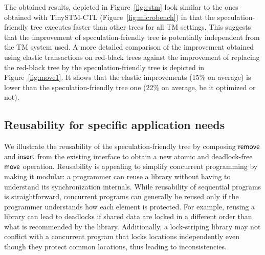 The obtained results, depicted in Figure~\ref{fig:estm} look similar to the ones obtained with TinySTM-CTL
(Figure~\ref{fig:microbench}) in that the speculation-friendly tree executes faster than other trees for all TM settings.
This suggests that the improvement of speculation-friendly tree 
is potentially independent from the TM system used.
A more detailed comparison of the improvement obtained
using elastic transactions on red-black trees against the improvement of replacing the red-black tree by the speculation-friendly tree
is depicted in Figure~\ref{fig:move1}. It shows that the elastic improvements (15\% on average) is lower than the 
speculation-friendly tree one (22\% on average, be it optimized or not). 

\subsection{Reusability for specific application needs}

We illustrate the reusability of the speculation-friendly tree by composing $\act{remove}$ and $\act{insert}$ from the existing interface to obtain a new
atomic and deadlock-free $\act{move}$ operation.
Reusability is appealing to simplify concurrent programming by making it modular:
a programmer can reuse a library without having to understand its synchronization internals.
While reusability of sequential programs is straightforward, concurrent programs can generally be reused only 
if the programmer understands how each element is protected. For example, reusing a library can lead to deadlocks
if shared data are locked in a different order than what is recommended by the library. Additionally, a lock-striping library
may not conflict with a concurrent program that locks locations independently even though they protect common locations, 
thus leading to inconsistencies.

